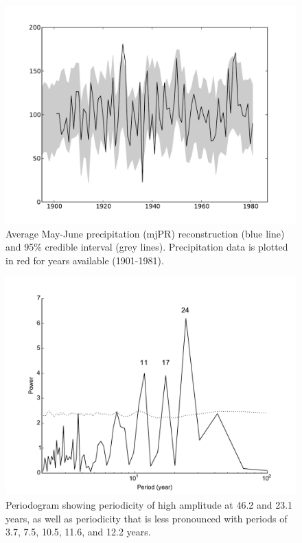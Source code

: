 \begin{figure}
\centering
\includegraphics[width=6in]{figures/reconPrecip.pdf}
\caption{Average May-June precipitation (mjPR) reconstruction (blue line) and 95\% credible interval (grey lines). Precipitation data is plotted in red for years available (1901-1981).}
\label{fig:precipRecon}
\end{figure}

\begin{figure}
\centering
\includegraphics[width=6in]{figures/spectralRecon.pdf}
\caption{Periodogram showing periodicity of high amplitude at 46.2 and 23.1 years, as well as periodicity that is less pronounced with periods of 3.7, 7.5, 10.5, 11.6, and 12.2 years.}
\label{fig:spectral}
\end{figure}


